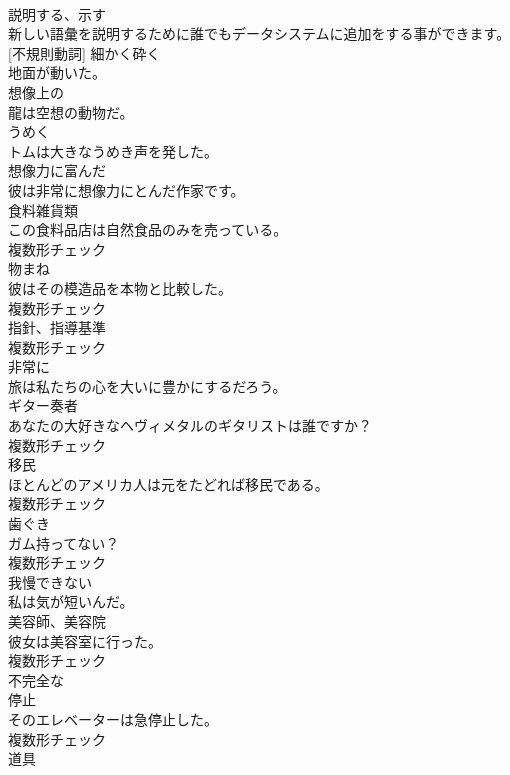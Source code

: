 \documentclass[8pt]{extreport}
\begin{document}
\begin{CJK}{UTF8}{min}
\\	[動詞]	説明する、示す	
\\	新しい語彙を説明するために誰でもデータシステムに追加をする事ができます。	
\\	[動詞] [不規則動詞]	細かく砕く	
\\	地面が動いた。	
\\	[形容詞]	想像上の	
\\	龍は空想の動物だ。	
\\	[動詞]	うめく	
\\	トムは大きなうめき声を発した。	
\\	[形容詞]	想像力に富んだ	
\\	彼は非常に想像力にとんだ作家です。	
\\	[名詞]	食料雑貨類	
\\	この食料品店は自然食品のみを売っている。	
\\	複数形チェック
\\	[名詞]	物まね	
\\	彼はその模造品を本物と比較した。	
\\	複数形チェック
\\	[名詞]	指針、指導基準	
\\	複数形チェック
\\	[副詞]	非常に	
\\	旅は私たちの心を大いに豊かにするだろう。	
\\	[名詞]	ギター奏者	
\\	あなたの大好きなヘヴィメタルのギタリストは誰ですか？	
\\	複数形チェック
\\	[名詞]	移⺠	
\\	ほとんどのアメリカ人は元をたどれば移民である。	
\\	複数形チェック
\\	[名詞]	⻭ぐき	
\\	ガム持ってない？	
\\	複数形チェック
\\	[形容詞]	我慢できない	
\\	私は気が短いんだ。	
\\	[名詞]	美容師、美容院	
\\	彼女は美容室に行った。	
\\	複数形チェック
\\	[形容詞]	不完全な	
\\	[名詞]	停止	
\\	そのエレベーターは急停止した。	
\\	複数形チェック
\\	[名詞]	道具	

\end{CJK}
\end{document}
